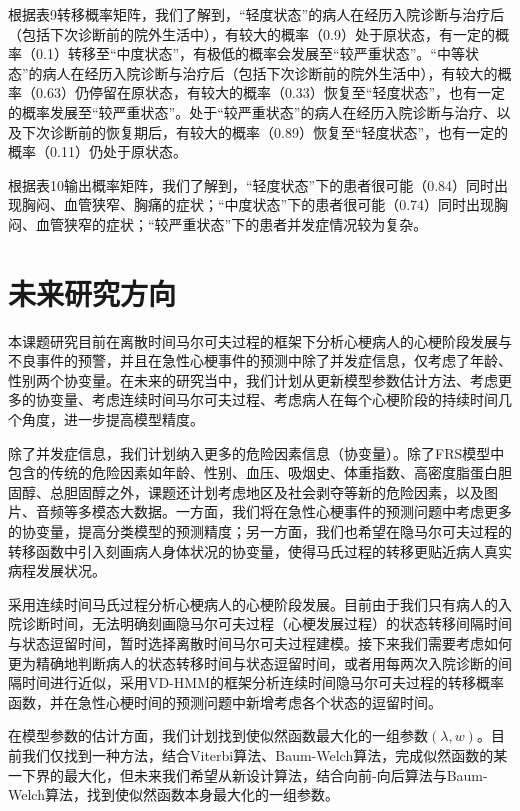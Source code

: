 \documentclass{article}
\begin{document}
根据表9转移概率矩阵，我们了解到，“轻度状态”的病人在经历入院诊断与治疗后（包括下次诊断前的院外生活中），有较大的概率（0.9）处于原状态，有一定的概率（0.1）转移至“中度状态”，有极低的概率会发展至“较严重状态”。“中等状态”的病人在经历入院诊断与治疗后（包括下次诊断前的院外生活中），有较大的概率（0.63）仍停留在原状态，有较大的概率（0.33）恢复至“轻度状态”，也有一定的概率发展至“较严重状态”。处于“较严重状态”的病人在经历入院诊断与治疗、以及下次诊断前的恢复期后，有较大的概率（0.89）恢复至“轻度状态”，也有一定的概率（0.11）仍处于原状态。

根据表10输出概率矩阵，我们了解到，“轻度状态”下的患者很可能（0.84）同时出现胸闷、血管狭窄、胸痛的症状；“中度状态”下的患者很可能（0.74）同时出现胸闷、血管狭窄的症状；“较严重状态”下的患者并发症情况较为复杂。


\section{未来研究方向}
本课题研究目前在离散时间马尔可夫过程的框架下分析心梗病人的心梗阶段发展与不良事件的预警，并且在急性心梗事件的预测中除了并发症信息，仅考虑了年龄、性别两个协变量。在未来的研究当中，我们计划从更新模型参数估计方法、考虑更多的协变量、考虑连续时间马尔可夫过程、考虑病人在每个心梗阶段的持续时间几个角度，进一步提高模型精度。

除了并发症信息，我们计划纳入更多的危险因素信息（协变量）。除了FRS模型中包含的传统的危险因素如年龄、性别、血压、吸烟史、体重指数、高密度脂蛋白胆固醇、总胆固醇之外，课题还计划考虑地区及社会剥夺等新的危险因素，以及图片、音频等多模态大数据。一方面，我们将在急性心梗事件的预测问题中考虑更多的协变量，提高分类模型的预测精度；另一方面，我们也希望在隐马尔可夫过程的转移函数中引入刻画病人身体状况的协变量，使得马氏过程的转移更贴近病人真实病程发展状况。

采用连续时间马氏过程分析心梗病人的心梗阶段发展。目前由于我们只有病人的入院诊断时间，无法明确刻画隐马尔可夫过程（心梗发展过程）的状态转移间隔时间与状态逗留时间，暂时选择离散时间马尔可夫过程建模。接下来我们需要考虑如何更为精确地判断病人的状态转移时间与状态逗留时间，或者用每两次入院诊断的间隔时间进行近似，采用VD-HMM的框架分析连续时间隐马尔可夫过程的转移概率函数，并在急性心梗时间的预测问题中新增考虑各个状态的逗留时间。

在模型参数的估计方面，我们计划找到使似然函数最大化的一组参数$(\lambda,w)$。目前我们仅找到一种方法，结合Viterbi算法、Baum-Welch算法，完成似然函数的某一下界的最大化，但未来我们希望从新设计算法，结合向前-向后算法与Baum-Welch算法，找到使似然函数本身最大化的一组参数。
\end{document}
